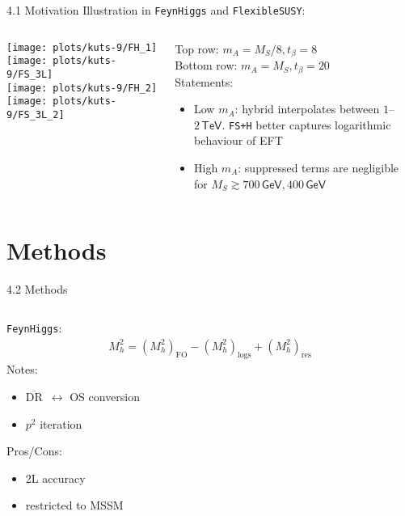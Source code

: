 \documentclass[hyperref={pdfpagelabels=false},ngerman]{beamer}
\newcommand{\cmark}{\ding{51}}%
\newcommand{\xmark}{\ding{55}}%
\newcommand{\eh}[1]{\,\mathsf{#1}}
\newcommand{\GeV}{\eh{GeV}}
\newcommand{\TeV}{\eh{TeV}}
\newcommand{\ok}{\textcolor{darkgreen}{\cmark}}
\newcommand{\notok}{\textcolor{red}{\xmark}}
\newcommand{\MS}{\ensuremath{M_S}}
\newcommand{\DRbar}{\ensuremath{\overline{\text{DR}}}}
\newcommand{\fs}{\texttt{FlexibleSUSY}\xspace}
\newcommand{\FH}{\texttt{FeynHiggs}\xspace}
\begin{document}
\begin{frame}{4.1 Motivation}
  Illustration in \FH and \fs:
  \begin{columns}
    \begin{column}{0.6\textwidth}
      \begin{center}
        \texttt{[image: plots/kuts-9/FH\_1]}
        \texttt{[image: plots/kuts-9/FS\_3L]}\\
        \texttt{[image: plots/kuts-9/FH\_2]}
        \texttt{[image: plots/kuts-9/FS\_3L\_2]}
      \end{center}
    \end{column}
    \begin{column}{0.4\textwidth}
      Top row: $m_A = \MS/8, t_\beta = 8$\\[1em]
      Bottom row: $m_A = \MS, t_\beta = 20$\\[1em]
      Statements:
      \begin{itemize}
      \item Low $m_A$: hybrid interpolates between $1$--$2\TeV$.
        \texttt{FS+H} better captures logarithmic behaviour of EFT
      \item High $m_A$: suppressed terms are negligible for
        $\MS \gtrsim 700\GeV, 400\GeV$
      \end{itemize}
    \end{column}
  \end{columns}
\end{frame}

\section{Methods}

\begin{frame}{4.2 Methods}
    \begin{columns}
    \begin{column}{0.5\textwidth}
      \centering
      \texttt{[image: \{\{plots/kuts-9/4.2]}}}
    \end{column}
    \begin{column}{0.5\textwidth}
      \FH:
      \begin{align*}
        M_h^2 = (M_h^2)_{\text{FO}} - (M_h^2)_{\text{logs}} + (M_h^2)_{\text{res}}
      \end{align*}
      Notes:
      \begin{itemize}
      \item \DRbar\ $\leftrightarrow$ OS conversion
      \item $p^2$ iteration
      \end{itemize}
      Pros/Cons:
      \begin{itemize}
      \item[\ok] 2L accuracy
      \item[\notok] restricted to MSSM
      \end{itemize}
    \end{column}
  \end{columns}
\end{frame}
\end{document}
